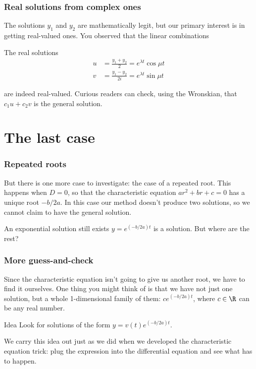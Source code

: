 \begin{frame}

\frametitle{Real solutions from complex ones}
\label{realsolutionsfromcomplexones}

The solutions $ y_1 $ and $ y_2 $ are mathematically legit, but our primary interest is in getting real-valued ones. You observed that the linear combinations
 
\begin{block}{The real solutions}
\begin{align*}
    u &= \frac{y_1 + y_2}{2}  = e^{\lambda t} \cos{\mu t} \\
    v &= \frac{y_1 - y_2}{2i} = e^{\lambda t} \sin{\mu t}
\end{align*}
\end{block}

are indeed real-valued. Curious readers can check, using the Wronskian, that $ c_1 u + c_2 v $ is the general solution.

\end{frame}

\section{The last case}
\label{thelastcase}

\begin{frame}

\frametitle{Repeated roots}
\label{repeatedroots}

But there is one more case to investigate: the case of a repeated root. This happens when $ D = 0 $, so that the characteristic equation $ ar^2 + br + c = 0 $ has a unique root $ -b/2a $. In this case our method doesn't produce two solutions, so we cannot claim to have the general solution.

 
\begin{block}{An exponential solution still exists}
    \( y = e^{(-b/2a)t} \) is a solution. But where are the rest?
\end{block}
 

\end{frame}

\begin{frame}

\frametitle{More guess-and-check}
\label{moreguess-and-check}

Since the characteristic equation isn't going to give us another root, we have to find it ourselves. One thing you might think of is that we have not just one solution, but a whole 1-dimensional family of them: $ c e^{(-b/2a)t} $, where $ c \in \R $ can be any real number. 


\begin{block}{Idea}
    Look for solutions of the form \( y = v(t) e^{(-b/2a)t} \).
\end{block}


We carry this idea out just as we did when we developed the characteristic equation trick: plug the expression into the differential equation and see what has to happen.

\end{frame}

